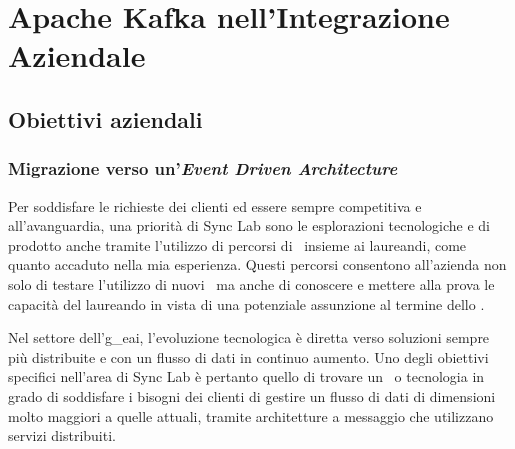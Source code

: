 \chapter{Apache Kafka nell’Integrazione Aziendale}

\section{Obiettivi aziendali}
\subsection{Migrazione verso un'\textit{Event Driven Architecture}}

Per soddisfare le richieste dei clienti ed essere sempre competitiva e all'avanguardia, una priorità di Sync Lab sono le esplorazioni tecnologiche e di prodotto anche tramite l'utilizzo di percorsi di \stage\ insieme ai laureandi, come quanto accaduto nella mia esperienza.
Questi percorsi consentono all'azienda non solo di testare l'utilizzo di nuovi \software\ ma anche di conoscere e mettere alla prova le capacità del laureando in vista di una potenziale assunzione al termine dello \stage.

Nel settore dell'\gls{g_eai}, l'evoluzione tecnologica è diretta verso soluzioni sempre più distribuite e con un flusso di dati in continuo aumento.
Uno degli obiettivi specifici nell'area  di Sync Lab è pertanto quello di trovare un \software\ o tecnologia in grado di soddisfare i bisogni dei clienti di gestire un flusso di dati di dimensioni molto maggiori a quelle attuali, tramite architetture a messaggio che utilizzano servizi distribuiti.

